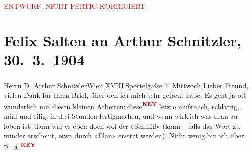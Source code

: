 
\begin{center}
            \textcolor{red}{ENTWURF, NICHT FERTIG KORRIGIERT}
                      \end{center}
            
         
         \renewcommand{\erwaehntePersonen}{Personen: Ottilie Salten, Paul Salten, Olga Schnitzler}
         \renewcommand{\erwaehnteOrte}{Orte: Edmund-Weiß-Gasse, I., Innere Stadt, Wien, XVIII., Währing}
         \renewcommand{\erwaehnteWerke}{}
               \section[Felix Salten an Arthur Schnitzler, 30. 3. 1904]{ Felix Salten an Arthur Schnitzler, 30. 3. 1904}\nopagebreak{}\rehead{ }\begin{ledgroupsized}[t]{13cm}\normalsize\beginnumbering \toendnotes[C]{\smallbreak\pagebreak[2]} 
\toendnotes[C]{\smallbreak}\pstart{}{\pb}Herrn D\textsuperscript{r} Arthur Schnitzler\pend{}\pstart{}Wien XVIII.\pend{}\pstart{}Spöttelgaſse 7.\pend{}{\bigskip}\pstart
           \raggedleft{}{\pb}Mittwoch\pend
           \pstart
           Lieber Freund, vielen Dank für Ihren Brief, über den ich mich sehr
               gefreut habe. Es geht ja oft wunderlich mit diesen kleinen Arbeiten: diese\textcolor{red}{\textsuperscript{\textbf{KEY}}} letzte mußte ich, schläfrig, müd und eilig, in
               drei Stunden fertigmachen, und wenn wirklich was dran zu loben ist, dann war es eben
               doch wol der »Schmiß« (kann – falls das Wort zu minder erscheint, etwa durch »Elan«
               ersetzt werden). Nicht wenig bin ich über P. A.\textcolor{red}{\textsuperscript{\textbf{KEY}}}

\end{ledgroupsized}
